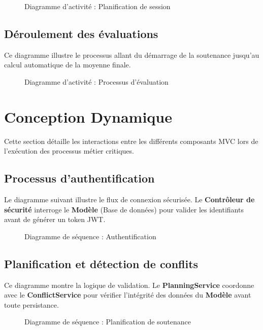 \documentclass[12pt,a4paper]{article}
\begin{document}
\begin{figure}[H]
    \centering
    \caption{Diagramme d'activité : Planification de session}
\end{figure}

\subsection{Déroulement des évaluations}
Ce diagramme illustre le processus allant du démarrage de la soutenance jusqu'au calcul automatique de la moyenne finale.

\begin{figure}[H]
    \centering
    \caption{Diagramme d'activité : Processus d'évaluation}
\end{figure}

\newpage
\section{Conception Dynamique}
\label{sec:dynamique}

Cette section détaille les interactions entre les différents composants MVC lors de l'exécution des processus métier critiques.

\subsection{Processus d'authentification}
Le diagramme suivant illustre le flux de connexion sécurisée. Le \textbf{Contrôleur de sécurité} interroge le \textbf{Modèle} (Base de données) pour valider les identifiants avant de générer un token JWT.

\begin{figure}[H]
    \centering
    \caption{Diagramme de séquence : Authentification}
\end{figure}

\subsection{Planification et détection de conflits}
Ce diagramme montre la logique de validation. Le \textbf{PlanningService} coordonne avec le \textbf{ConflictService} pour vérifier l'intégrité des données du \textbf{Modèle} avant toute persistance.

\begin{figure}[H]
    \centering
    \caption{Diagramme de séquence : Planification de soutenance}
\end{figure}
\end{document}
